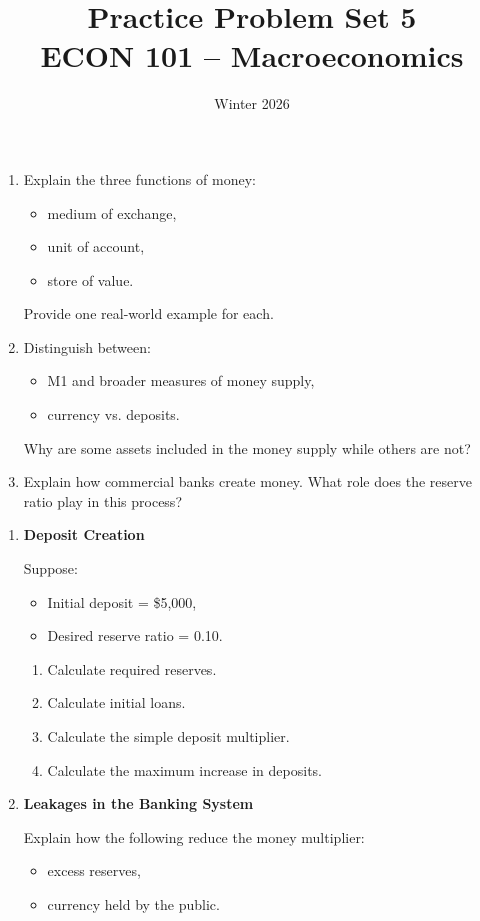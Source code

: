 \documentclass[12pt]{article}
\title{Practice Problem Set 5\\ \vspace{10pt} \large ECON 101 -- Macroeconomics}
\author{}
\date{ \vspace{-30pt} Winter 2026}
\begin{document}
\maketitle



\begin{enumerate}[label=\textbf{\arabic*.}]

\item Explain the three functions of money:
\begin{itemize}
    \item medium of exchange,
    \item unit of account,
    \item store of value.
\end{itemize}
Provide one real-world example for each.

\item Distinguish between:
\begin{itemize}
    \item M1 and broader measures of money supply,
    \item currency vs. deposits.
\end{itemize}
Why are some assets included in the money supply while others are not?

\item Explain how commercial banks create money. 
What role does the reserve ratio play in this process?

\end{enumerate}



\begin{enumerate}[label=\textbf{\arabic*.}, start=4]

\item \textbf{Deposit Creation}

Suppose:
\begin{itemize}
    \item Initial deposit = \$5,000,
    \item Desired reserve ratio = 0.10.
\end{itemize}

\begin{enumerate}
    \item[(a)] Calculate required reserves.
    \item[(b)] Calculate initial loans.
    \item[(c)] Calculate the simple deposit multiplier.
    \item[(d)] Calculate the maximum increase in deposits.
\end{enumerate}

\item \textbf{Leakages in the Banking System}

Explain how the following reduce the money multiplier:
\begin{itemize}
    \item excess reserves,
    \item currency held by the public.
\end{itemize}

\end{enumerate}
\end{document}
